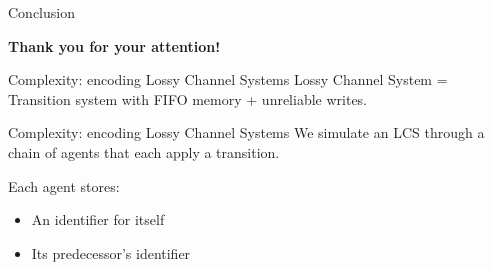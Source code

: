 \documentclass{beamer}
\begin{document}
	
	

\begin{frame}{Conclusion}
		
	

	\Huge \textbf{Thank you for your attention!}
\end{frame}

\appendix
 \begin{frame}
  
 \end{frame}
\begin{frame}{Complexity: encoding Lossy Channel Systems}
	Lossy Channel System = Transition system with FIFO memory + unreliable writes.\vspace{1cm}
	
	
\end{frame}


\begin{frame}{Complexity: encoding Lossy Channel Systems}
	We simulate an LCS through a chain of agents that each apply a transition.
	
	Each agent stores:
	\begin{itemize}
		\item An identifier for itself
		
		\item Its predecessor's identifier
	\end{itemize} 
	
	
	
\end{frame}
\end{document}
